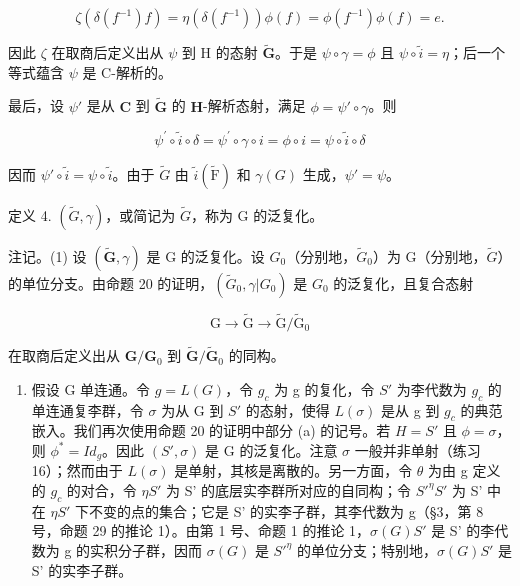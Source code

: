 \[
\zeta (\delta (f ^ {- 1}) f) = \eta (\delta (f ^ {- 1})) \phi (f) = \phi (f ^ {- 1}) \phi (f) = e.
\]

因此 \(\zeta\) 在取商后定义出从 \(\psi\) 到 H 的态射 \(\tilde{\mathbf{G}}\)。于是 \(\psi \circ \gamma = \phi\) 且 \(\psi \circ \tilde{i} = \eta\)；后一个等式蕴含 \(\psi\) 是 C-解析的。

最后，设 \(\psi'\) 是从 \(\mathbf{C}\) 到 \(\tilde{\mathbf{G}}\) 的 \(\mathbf{H}\)-解析态射，满足 \(\phi = \psi' \circ \gamma\)。则

\[
\psi^ {\prime} \circ \tilde {i} \circ \delta = \psi^ {\prime} \circ \gamma \circ i = \phi \circ i = \psi \circ \tilde {i} \circ \delta
\]

因而 \(\psi' \circ \tilde{i} = \psi \circ \tilde{i}\)。由于 \(\tilde{G}\) 由 \(\tilde{i}(\tilde{\mathrm{F}})\) 和 \(\gamma(G)\) 生成，\(\psi' = \psi\)。

定义 4. \((\tilde{G},\gamma)\)，或简记为 \(\tilde{G}\)，称为 G 的泛复化。

注记。(1) 设 \((\tilde{\mathbf{G}},\gamma)\) 是 G 的泛复化。设 \(G_0\)（分别地，\(\tilde{G}_0\)）为 G（分别地，\(\tilde{G}\)）的单位分支。由命题 20 的证明，\((\tilde{G}_0,\gamma |G_0)\) 是 \(G_0\) 的泛复化，且复合态射

\[
\mathrm{G} \rightarrow \tilde {\mathrm{G}} \rightarrow \tilde {\mathrm{G}} / \tilde {\mathrm{G}} _ {0}
\]

在取商后定义出从 \(\mathbf{G} / \mathbf{G}_0\) 到 \(\tilde{\mathbf{G}} / \tilde{\mathbf{G}}_0\) 的同构。

\begin{enumerate}
\def\labelenumi{(\arabic{enumi})}
\setcounter{enumi}{1}
\tightlist
\item
  假设 G 单连通。令 \(g = L(G)\)，令 \(g_{c}\) 为 g 的复化，令 \(S'\) 为李代数为 \(g_{c}\) 的单连通复李群，令 \(\sigma\) 为从 G 到 \(S'\) 的态射，使得 \(L(\sigma)\) 是从 g 到 \(g_{c}\) 的典范嵌入。我们再次使用命题 20 的证明中部分 (a) 的记号。若 \(H = S'\) 且 \(\phi = \sigma\)，则 \(\phi^{*} = I d_{g}\)。因此 \((S', \sigma)\) 是 G 的泛复化。注意 \(\sigma\) 一般并非单射（练习 16）；然而由于 \(L(\sigma)\) 是单射，其核是离散的。另一方面，令 \(\theta\) 为由 g 定义的 \(g_{c}\) 的对合，令 \(\eta\)\(S'\) 为 S' 的底层实李群所对应的自同构；令 \(S'^{\eta}\)\(S'\) 为 S' 中在 \(\eta\)\(S'\) 下不变的点的集合；它是 S' 的实李子群，其李代数为 g（§3，第 8 号，命题 29 的推论 1）。由第 1 号、命题 1 的推论 1，\(\sigma(G)\)\(S'\) 是 S' 的李代数为 g 的实积分子群，因而 \(\sigma(G)\) 是 \(S'^{\eta}\) 的单位分支；特别地，\(\sigma(G)\)\(S'\) 是 S' 的实李子群。
\end{enumerate}

